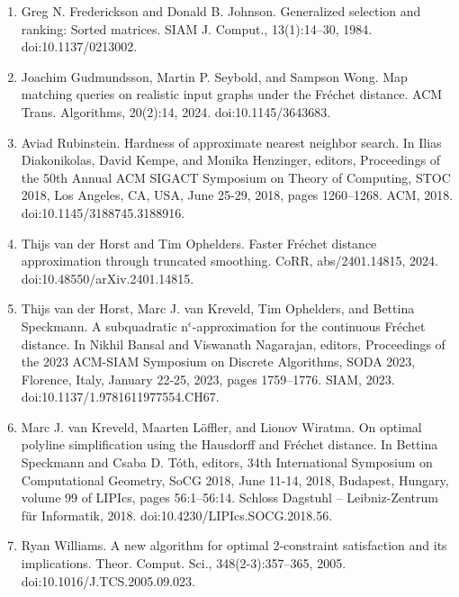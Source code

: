 \documentclass[10pt,a4paper]{article}
\begin{document}
\begin{enumerate}
\item[]  [23]  Greg N. Frederickson and Donald B. Johnson.  Generalized selection and ranking: Sorted matrices.  SIAM J. Comput., 13(1):14–30, 1984.  doi:10.1137/0213002.  
\item[]  [24]  Joachim Gudmundsson, Martin P. Seybold, and Sampson Wong.  Map matching queries on realistic input graphs under the Fréchet distance.  ACM Trans. Algorithms, 20(2):14, 2024.  doi:10.1145/3643683.  
\item[]  [25]  Aviad Rubinstein.  Hardness of approximate nearest neighbor search.  In Ilias Diakonikolas, David Kempe, and Monika Henzinger, editors, Proceedings of the 50th Annual ACM SIGACT Symposium on Theory of Computing, STOC 2018, Los Angeles, CA, USA, June 25-29, 2018, pages 1260–1268. ACM, 2018.  doi:10.1145/3188745.3188916.  
\item[]  [26]  Thijs van der Horst and Tim Ophelders.  Faster Fréchet distance approximation through truncated smoothing.  CoRR, abs/2401.14815, 2024.  doi:10.48550/arXiv.2401.14815.  
\item[]  [27]  Thijs van der Horst, Marc J. van Kreveld, Tim Ophelders, and Bettina Speckmann.  A subquadratic n${}^{\mbox{{$\epsilon$}}}$-approximation for the continuous Fréchet distance.  In Nikhil Bansal and Viswanath Nagarajan, editors, Proceedings of the 2023 ACM-SIAM Symposium on Discrete Algorithms, SODA 2023, Florence, Italy, January 22-25, 2023, pages 1759–1776. SIAM, 2023.  doi:10.1137/1.9781611977554.CH67.  
\item[]  [28]  Marc J. van Kreveld, Maarten Löffler, and Lionov Wiratma.  On optimal polyline simplification using the Hausdorff and Fréchet distance.  In Bettina Speckmann and Csaba D. Tóth, editors, 34th International Symposium on Computational Geometry, SoCG 2018, June 11-14, 2018, Budapest, Hungary, volume 99 of LIPIcs, pages 56:1–56:14. Schloss Dagstuhl – Leibniz-Zentrum für Informatik, 2018.  doi:10.4230/LIPIcs.SOCG.2018.56.  
\item[]  [29]  Ryan Williams.  A new algorithm for optimal 2-constraint satisfaction and its implications.  Theor. Comput. Sci., 348(2-3):357–365, 2005.  doi:10.1016/J.TCS.2005.09.023.  
\end{enumerate}
\end{document}
